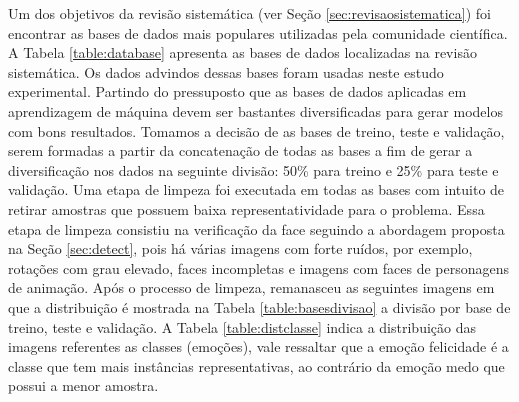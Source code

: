 Um dos objetivos da revisão sistemática (ver Seção \ref{sec:revisaosistematica}) foi encontrar as bases de dados mais populares utilizadas pela comunidade científica. A Tabela \ref{table:database} apresenta as bases de dados localizadas na revisão sistemática. Os dados advindos dessas bases foram usadas neste estudo experimental. Partindo do pressuposto que as bases de dados aplicadas em aprendizagem de máquina devem ser bastantes diversificadas para gerar modelos com bons resultados. Tomamos a decisão de as bases de treino, teste e validação, serem formadas a partir da concatenação de todas as bases a fim de gerar a diversificação nos dados na seguinte divisão: 50\% para treino e 25\% para teste e validação. Uma etapa de limpeza foi executada em todas as bases com intuito de retirar amostras que possuem baixa representatividade para o problema. Essa etapa de limpeza consistiu na verificação da face seguindo a abordagem proposta na Seção \ref{sec:detect}, pois há várias imagens com forte ruídos, por exemplo, rotações com grau elevado, faces incompletas e imagens com faces de personagens de animação. Após o processo de limpeza, remanasceu as seguintes imagens em que a distribuição é mostrada na Tabela \ref{table:basesdivisao} a divisão por base de treino, teste e validação. A Tabela \ref{table:distclasse} indica a distribuição das imagens referentes as classes (emoções), vale ressaltar que a emoção felicidade é a classe que tem mais instâncias representativas, ao contrário da emoção medo que possui a menor amostra.


